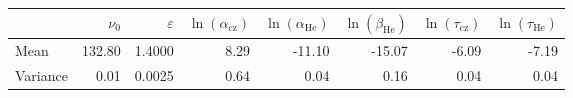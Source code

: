 \begin{tabular}{lrrrrrrr}
\toprule
 & $\nu_0$ & $\varepsilon$ & $\ln(\alpha_\mathrm{cz})$ & $\ln(\alpha_\mathrm{He})$ & $\ln(\beta_\mathrm{He})$ & $\ln(\tau_\mathrm{cz})$ & $\ln(\tau_\mathrm{He})$ \\
\midrule
Mean & 132.80 & 1.4000 & 8.29 & -11.10 & -15.07 & -6.09 & -7.19 \\
Variance & 0.01 & 0.0025 & 0.64 & 0.04 & 0.16 & 0.04 & 0.04 \\
\bottomrule
\end{tabular}
